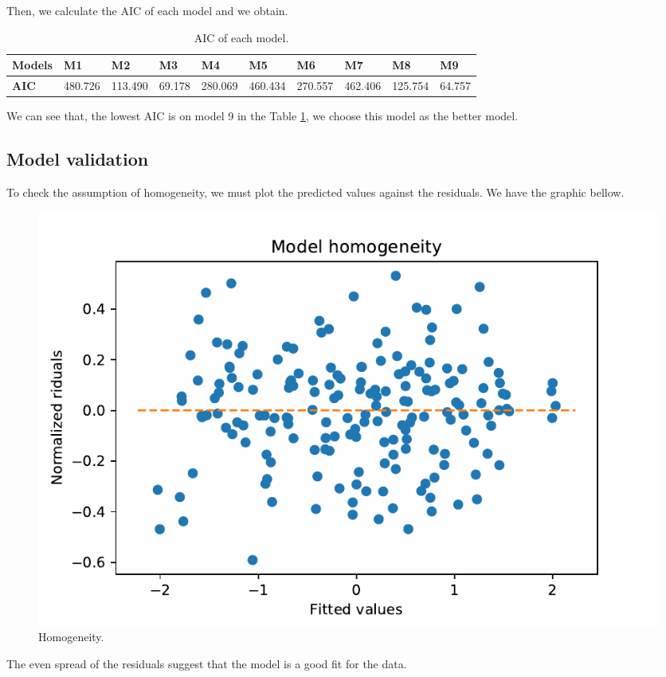 \documentclass{article}
\begin{document}
Then, we calculate the AIC of each model and we obtain.
\begin{table}[h!]
   \centering
    \begin{tabular}{ |p{2cm}||p{1cm}|p{1cm}|p{1cm}|p{1cm}|p{1cm}|p{1cm}|p{1cm}|p{1cm}|p{1cm}|}
    \hline
    \textbf{Models} & M1 & M2 & M3 & M4 & M5 & M6 & M7 & M8 & M9\\
    \hline
     \textbf{AIC} & 480.726 & 113.490 & 69.178 & 280.069 & 460.434 & 270.557 & 462.406 & 125.754 & 64.757\\ 
     \hline
    \end{tabular}
    \caption{AIC of each model.}
    \label{Tableau AIC}
\end{table}

We can see that, the lowest AIC is on model 9 in the Table \ref{Tableau AIC}, we choose this model as the better model.

\subsection{Model validation}

To check the assumption of homogeneity, we must plot the predicted values against the residuals. We have the graphic bellow. 
\begin{figure}[h!]
    \centering
    \includegraphics[scale=0.7]{images/Model_validation_homo.pdf}
    \caption{Homogeneity.}
    \label{Homogeneity}
\end{figure}
The even spread of the residuals suggest that the model is a good fit for the data.
\end{document}
